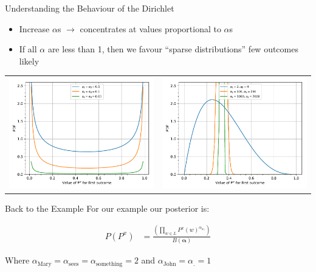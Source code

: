 \documentclass[11pt]{beamer}
\begin{document}
	\begin{frame}{Understanding the Behaviour of the Dirichlet}
		\begin{itemize}
			\item Increase $\alpha$s $\rightarrow$ concentrates at values proportional to $\alpha$s
			\item If all $\alpha$ are less than 1, then we favour ``sparse distributions'' few outcomes likely
		\end{itemize}
		
		\begin{tabular}{lr}
			\includegraphics[width=0.49\linewidth]{dirichlet_distribution_sparse_pdf} &
			\includegraphics[width=0.49\linewidth]{dirichlet_distribution_dense_pdf} \\
		\end{tabular}
	\end{frame}
		
	\begin{frame}{Back to the Example}
		For our example our posterior is:

		\vspace{10pt}		
		\begin{align*}
			P(P^x) & = \frac{\left(\prod_{w \in L} P^{x}(w)^{\alpha_{w_i}}\right)}{B(\boldsymbol{\alpha})}
		\end{align*}
		
		\vspace{10pt} Where $\alpha_{\text{Mary}}=\alpha_{\text{sees}} = \alpha_{\text{something}} = 2$ and $\alpha_{\text{John}}=\alpha_{\text{.}}=1$
	\end{frame}
	
\end{document}
